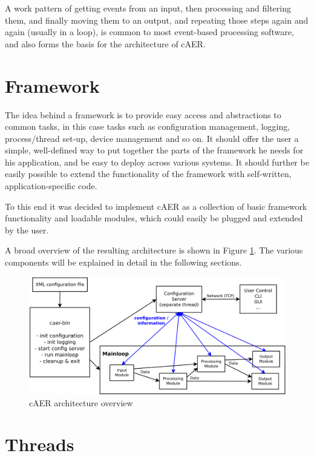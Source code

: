 \documentclass[a4paper,12pt]{report}
\begin{document}
A work pattern of getting events from an input, then processing and filtering them, and finally moving them to an output, and repeating those steps again and again (usually in a loop), is common to most event-based processing software, and also forms the basis for the architecture of cAER.

\section{Framework} \label{sec:framework}

The idea behind a framework is to provide easy access and abstractions to common tasks, in this case tasks such as configuration management, logging, process/thread set-up, device management and so on.
It should offer the user a simple, well-defined way to put together the parts of the framework he needs for his application, and be easy to deploy across various systems.
It should further be easily possible to extend the functionality of the framework with self-written, application-specific code.

To this end it was decided to implement cAER as a collection of basic framework functionality and loadable modules, which could easily be plugged and extended by the user.

A broad overview of the resulting architecture is shown in Figure \ref{fig:caer_architecture}. The various components will be explained in detail in the following sections.

\begin{figure}[H]
\begin{center}
\includegraphics[width=\textwidth]{caer_architecture}
\caption{cAER architecture overview}
\label{fig:caer_architecture}
\end{center}
\end{figure}

\section{Threads} \label{sec:threads}
\end{document}
